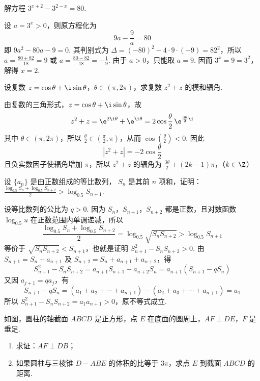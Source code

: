 \documentclass[UTF8,a4paper,oneside,11pt]{ctexbook}
\begin{document}
\begin{problem}
解方程 \(3^{x + 2} - 3^{2 - x} = 80\).
\end{problem}

\begin{solution}
设 \(a=3^x>0\)，则原方程化为
\[
9a-\frac{9}{a}=80
\]
即 \(9a^2-80a-9=0\). 其判别式为 \(\Delta=(-80)^2-4\cdot9\cdot(-9)=82^2\)，所以 \(a=\frac{80+82}{18}=9\) 或 \(a=\frac{80-82}{18}=-\frac{1}{9}\).
由于 \(a>0\)，只能取 \(a=9\). 因而 \(3^x=9=3^2\)，解得 \(x=2\).
\end{solution}

\begin{problem}
设复数 \(z = \cos \theta + \i\sin \theta\)，\(\theta \in (\pi, 2\pi)\)，求复数 \(z^2 + z\) 的模和辐角.
\end{problem}

\begin{solution}
由复数的三角形式，\(z=\cos\theta+\i\sin\theta\)，故
\[
z^2+z=\e^{2\i\theta}+\e^{\i\theta}=2\cos\frac{\theta}{2}\,\e^{\frac{3\theta}{2}\i}
\]
其中 \(\theta\in(\pi,2\pi)\)，所以 \(\frac{\theta}{2}\in(\frac{\pi}{2},\pi)\)，从而 \(\cos(\frac{\theta}{2})<0\). 因此
\[
\left|z^2+z\right|=-2\cos\frac{\theta}{2}
\]
且负实数因子使辐角增加 \(\pi\)，所以 \(z^2+z\) 的辐角为
\(\frac{3\theta}{2}+(2k-1)\pi\)，（\(k\in\Z\)）
\end{solution}

\begin{problem}
设 \(\{a_{n}\} \) 是由正数组成的等比数列， \(S_{n} \) 是其前 \(n\) 项和，证明： \(\frac{\log_{0.5}S_{n}+\log_{0.5}S_{n+2}}{2}>\log_{0.5}S_{n+1}\).
\end{problem}

\begin{solution}
设等比数列的公比为 \(q>0\). 因为 \(S_n\)，\(S_{n+1}\)，\(S_{n+2}\) 都是正数，且对数函数 \(\log_{0.5}u\) 在正数范围内单调递减，所以
\[
\frac{\log_{0.5}S_n+\log_{0.5}S_{n+2}}{2}
=\log_{0.5}\sqrt{S_nS_{n+2}}>\log_{0.5}S_{n+1}
\]
等价于 \(\sqrt{S_nS_{n+2}}<S_{n+1}\)，也就是证明 \(S_{n+1}^2-S_nS_{n+2}>0\). 由 \(S_{n+1}=S_n+a_{n+1}\) 及 \(S_{n+2}=S_n+a_{n+1}+a_{n+2}\)，得
\[
S_{n+1}^2-S_nS_{n+2}=a_{n+1}S_{n+1}-a_{n+2}S_n=a_{n+1}\left(S_{n+1}-qS_n\right)
\]
又因 \(a_{j+1}=qa_j\)，有
\[
S_{n+1}-qS_n=(a_1+a_2+\cdots+a_{n+1})-(a_2+a_3+\cdots+a_{n+1})=a_1
\]
所以 \(S_{n+1}^2-S_nS_{n+2}=a_1a_{n+1}>0\)，原不等式成立.
\end{solution}

\begin{problem}
如图，圆柱的轴截面 \(ABCD\) 是正方形，点 \(E\) 在底面的圆周上，\(AF \perp DE\)，\(F\) 是垂足.

\begin{enumerate}
\item 求证：\(AF \perp DB\)；
\item 如果圆柱与三棱锥 \(D-ABE\) 的体积的比等于 \(3\pi \)，求点 \(E\) 到截面 \(ABCD\) 的距离.
\end{enumerate}

\end{problem}
\end{document}
